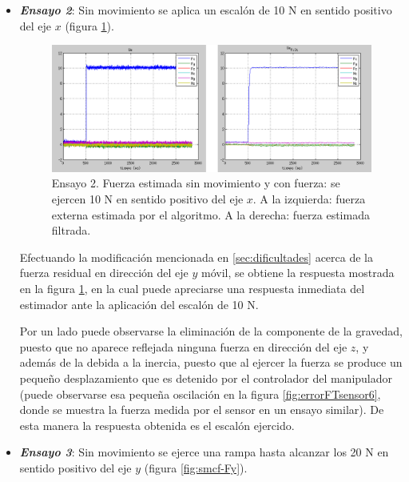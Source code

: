 \begin{itemize}
\item \textbf{\emph{Ensayo 2}}: Sin movimiento se aplica un escalón de 10 N en sentido positivo del eje $x$ (figura \ref{fig:smcf-Fx}).

\begin{figure}[h!]
\centering
\includegraphics[scale=0.4]{Figuras/smcf-Fx}
\caption[Ensayo 2. Fuerza estimada sin movimiento y con fuerza]{Ensayo 2. Fuerza estimada sin movimiento y con fuerza: se ejercen 10 N en sentido positivo del eje $x$. A la izquierda: fuerza externa estimada por el algoritmo. A la derecha: fuerza estimada filtrada.}
\label{fig:smcf-Fx}
\end{figure}

Efectuando la modificación mencionada en \ref{sec:dificultades} acerca de la fuerza residual en dirección del eje $y$ móvil, se obtiene la respuesta mostrada en la figura \ref{fig:smcf-Fx}, en la cual puede apreciarse una respuesta inmediata del estimador ante la aplicación del escalón de 10 N. \par 

Por un lado puede observarse la eliminación de la componente de la gravedad, puesto que no aparece reflejada ninguna fuerza en dirección del eje $z$, y además de la debida a la inercia, puesto que al ejercer la fuerza se produce un pequeño desplazamiento que es detenido por el controlador del manipulador (puede observarse esa pequeña oscilación en la figura \ref{fig:errorFTsensor6}, donde se muestra la fuerza medida por el sensor en un ensayo similar). De esta manera la respuesta obtenida es el escalón ejercido. \par 

\item \textbf{\emph{Ensayo 3}}: Sin movimiento se ejerce una rampa hasta alcanzar los 20 N en sentido positivo del eje $y$ (figura \ref{fig:smcf-Fy}).


\end{itemize}
